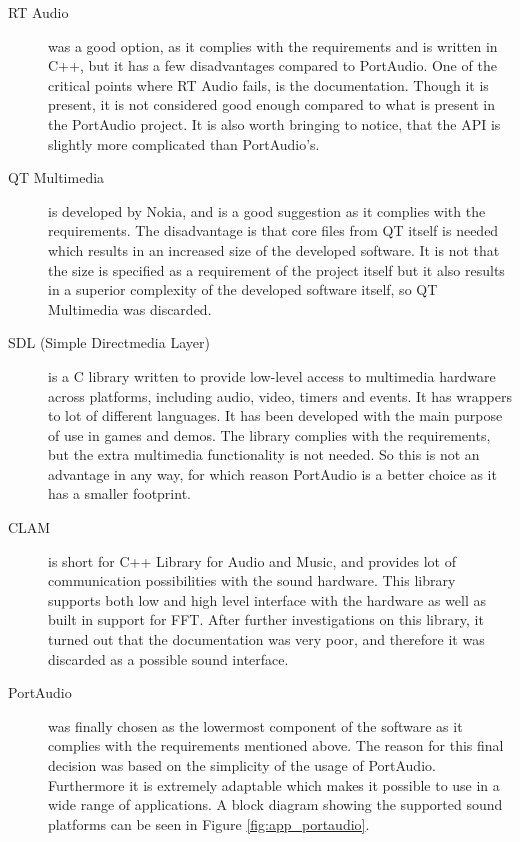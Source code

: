 \begin{description}
\item[RT Audio\footnotemark] was a good option, as it complies with the requirements and is written in C++, but it has a few disadvantages compared to PortAudio. One of the critical points where RT Audio fails, is the documentation. Though it is present, it is not considered good enough compared to what is present in the PortAudio project. It is also worth bringing to notice, that the API is slightly more complicated than PortAudio's.

\item[QT Multimedia\footnotemark] is developed by Nokia, and is a good suggestion as it complies with the requirements. The disadvantage is that core files from QT itself is needed which results in an increased size of the developed software. It is not that the size is specified as a requirement of the project itself but it also results in a superior complexity of the developed software itself, so QT Multimedia was discarded.

\item[SDL (Simple Directmedia Layer)\footnotemark]
 is a C library written to provide low-level access to multimedia hardware across platforms, including audio, video, timers and events. It has wrappers to lot of different languages. It has been developed with the main purpose of use in games and demos. The library complies with the requirements, but the extra multimedia functionality is not needed. So this is not an advantage in any way, for which reason PortAudio is a better choice as it has a smaller footprint.

\item[CLAM\footnotemark] is short for C++ Library for Audio and Music, and provides lot of communication possibilities with the sound hardware. This library supports both low and high level interface with the hardware as well as built in support for FFT. After further investigations on this library, it turned out that the documentation was very poor, and therefore it was discarded as a possible sound interface.

\item[PortAudio\footnotemark] was finally chosen as the lowermost component of the software as it complies with the requirements mentioned above.  The reason for this final decision was based on the simplicity of the usage of PortAudio. Furthermore it is extremely adaptable which makes it possible to use in a wide range of applications. A block diagram showing the supported sound platforms can be seen in Figure \ref{fig:app_portaudio}.
\end{description}

